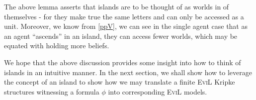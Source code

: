 The above lemma asserts that islands are to be thought of as worlds in
of themselves - for they make true the same letters and 
can only be accessed as a unit. Moreover, we know from \ref{ppV}, we
can see in the single agent case that as an agent ``ascends'' in an
island, they can access fewer worlds, which may be equated with
holding more beliefs.  



We hope that the above discussion provides some insight into how to
think of islands in an intuitive manner.  In the next section,
we shall show how to leverage the concept of an island to show
how we may translate a finite \textsc{EviL} Kripke structures
witnessing a formula $\phi$ into corresponding \textsc{EviL} models.



